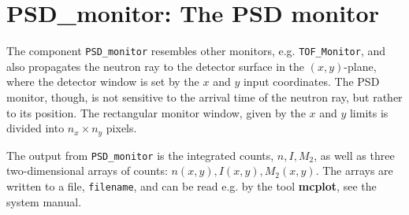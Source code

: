 
\section{PSD\_monitor: The PSD monitor}


The component \texttt{PSD\_monitor} resembles other monitors, e.g.
\texttt{TOF\_Monitor}, and also propagates the neutron ray to the detector
surface in the $(x,y)$-plane, where the detector window is set
by the $x$ and $y$ input coordinates.
The PSD monitor, though, is not sensitive to the arrival time
of the neutron ray, but rather to its position.
The rectangular monitor window, given by the $x$ and $y$
limits is divided into $n_x \times n_y$ pixels.

The output from \texttt{PSD\_monitor} is the integrated counts, $n, I, M_2$,
as well as
three two-dimensional arrays of counts: $n(x,y), I(x,y), M_2(x,y)$.
The arrays are written to a file, \verb+filename+, and can be read e.g. by the tool
\textbf{mcplot}, see the system manual.
